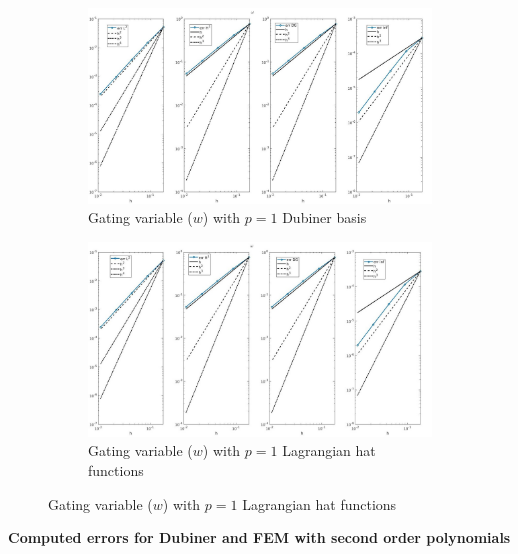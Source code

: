 \documentclass[a4paper,11pt]{article}
\begin{document}
\begin{figure}[H]
\caption{Comparison of the gating variable ($w$)}
\label{w_1}
\begin{subfigure}{\textwidth}
\begin{center}
\includegraphics[width = \textwidth]{./errors/D1_w_1.jpg}
\caption{Gating variable ($w$) with $p=1$ Dubiner basis}
\end{center}
\end{subfigure}
\begin{subfigure}{\textwidth}
\begin{center}
\includegraphics[width =\textwidth]{./errors/P1_w_1.jpg}
\caption{Gating variable ($w$) with $p=1$ Lagrangian hat functions}
\end{center}
\end{subfigure}
\end{figure}
\newpage
\begin{center}
\textbf{Computed errors for Dubiner and FEM with second order polynomials}
\end{center}
\end{document}

